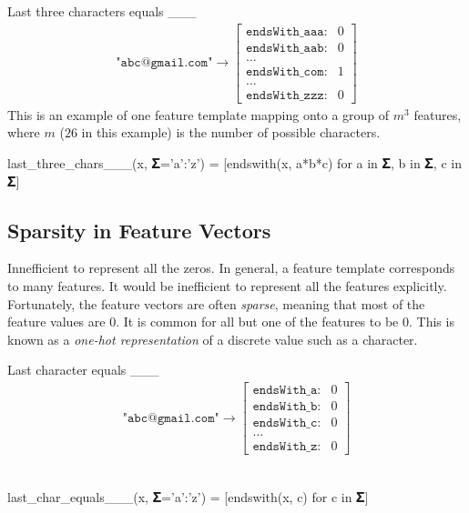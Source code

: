\begin{example}
 Last three characters equals \_\_\_
\begin{align*}
	\texttt{"abc@gmail.com"} \longrightarrow \begin{bmatrix}
	\texttt{endsWith\_aaa}: & 0\\
	\texttt{endsWith\_aab}: & 0\\
	\ldots \\
	\texttt{endsWith\_com}: & 1\\
	\ldots \\
	\texttt{endsWith\_zzz}: & 0
	\end{bmatrix}
\end{align*}
This is an example of one feature template mapping onto a group of $m^3$ features,
where $m$ ($26$ in this example) is the number of possible characters.
\br\\
\begin{exalgorithm}
\begin{juliaverbatim}
last_three_chars___(x, 𝚺='a':'z') = 
	[endswith(x, a*b*c) for a in 𝚺, b in 𝚺, c in 𝚺]
\end{juliaverbatim}
\end{exalgorithm}
\end{example}


\subsection{Sparsity in Feature Vectors} %
\label{sub:sparsity_in_feature_vectors}

Innefficient to represent all the zeros.
In general, a feature template corresponds to many features.
It would be inefficient to represent all the features explicitly.
Fortunately, the feature vectors are often \textit{sparse},
meaning that most of the feature values are $0$.
It is common for all but one of the features to be $0$.
This is known as a \textit{one-hot representation} of a discrete value such as a character.
\begin{example}
 Last character equals \_\_\_
\begin{align*}
	\texttt{"abc@gmail.com"} \longrightarrow \begin{bmatrix}
	\texttt{endsWith\_a}: & 0\\
	\texttt{endsWith\_b}: & 0\\
	\texttt{endsWith\_c}: & 0\\
	\ldots\\
	\texttt{endsWith\_z}: & 0
	\end{bmatrix}
\end{align*}
\br\\
\begin{exalgorithm}
\begin{juliaverbatim}
last_char_equals___(x, 𝚺='a':'z') = [endswith(x, c) for c in 𝚺]
\end{juliaverbatim}
\end{exalgorithm}
\end{example}


